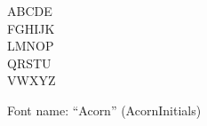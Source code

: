 \documentclass[a4paper]{article}
\begin{document}
\begin{center}
\fontsize{60pt}{72pt}
  ABCDE \\
  FGHIJK \\
  LMNOP \\
  QRSTU \\
  VWXYZ \\
\end{center}
\vfill
\begin{center}
Font name: ``Acorn'' (AcornInitials)
\end{center}
\end{document}
